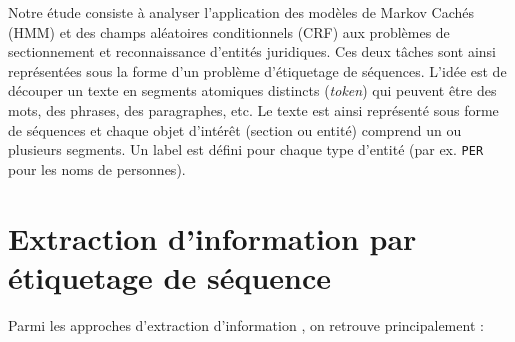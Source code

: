 Notre étude consiste à analyser l'application des modèles de Markov Cachés (HMM) et des champs aléatoires conditionnels (CRF) aux problèmes de sectionnement et reconnaissance d'entités juridiques. Ces deux tâches sont ainsi représentées sous la forme d'un problème d'étiquetage de séquences. L'idée est de découper un texte en segments atomiques distincts (\textit{token}) qui peuvent être des mots, des phrases, des paragraphes, etc. Le texte est ainsi représenté sous forme de séquences et chaque objet d'intérêt (section ou entité) comprend  un ou plusieurs segments. Un label est défini pour chaque type d'entité (par ex. \verb|PER| pour les noms de personnes). 


\section{Extraction d'information par étiquetage de séquence}
\label{sec:structuration:biblio}

Parmi les approches d'extraction d'information \citep{chau2002nerwithNN}, on retrouve principalement :

